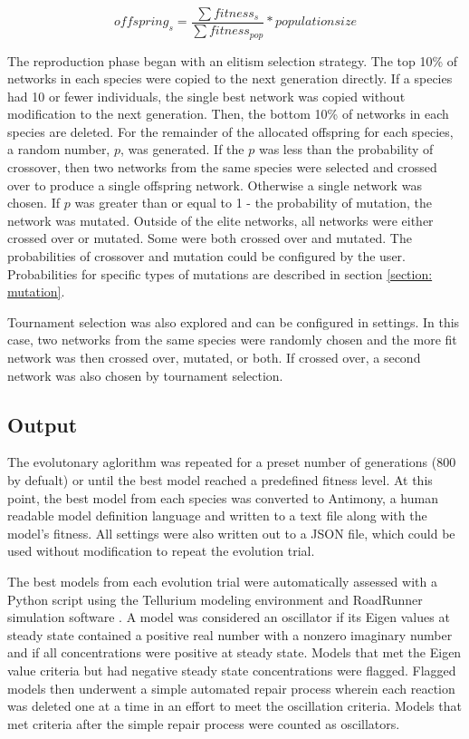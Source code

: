 \documentclass[12pt]{report}
\begin{document}
\begin{equation}
\label{equation: num_offspring}
offspring_{s} = \frac{\sum{fitness_{s}}}{\sum{fitness_{pop}}}*populationsize
\end{equation} 


The reproduction phase began with an elitism selection strategy. The top 10\% of networks in each species were copied to the next generation directly. If a species had 10 or fewer individuals, the single best network was copied without modification to the next generation. Then, the bottom 10\% of networks in each species are deleted. For the remainder of the allocated offspring for each species, a random number, $p$, was generated. If the $p$ was less than the probability of crossover, then two networks from the same species were selected and crossed over to produce a single offspring network. Otherwise a single network was chosen. If $p$ was greater than or equal to 1 - the probability of mutation, the network was mutated. Outside of the elite networks, all networks were either crossed over or mutated. Some were both crossed over and mutated. The probabilities of crossover and mutation could be configured by the user. Probabilities for specific types of mutations are described in section \ref{section: mutation}.

Tournament selection was also explored and can be configured in settings. In this case, two networks from the same species were randomly chosen and the more fit network was then crossed over, mutated, or both. If crossed over, a second network was also chosen by tournament selection.

\subsection{Output}
The evolutonary aglorithm was repeated for a preset number of generations (800 by defualt) or until the best model reached a predefined fitness level. At this point, the best model from each species was converted to Antimony, a human readable model definition language \cite{Smith2009} and written to a text file along with the model's fitness. All settings were also written out to a JSON file, which could be used without modification to repeat the evolution trial.

The best models from each evolution trial were automatically assessed with a Python script using the Tellurium modeling environment \cite{Choi2018} and RoadRunner simulation software \cite{andy2020}. A model was considered an oscillator if its Eigen values at steady state contained a positive real number with a nonzero imaginary number and if all concentrations were positive at steady state. Models that met the Eigen value criteria but had negative steady state concentrations were flagged. Flagged models then underwent a simple automated repair process wherein each reaction was deleted one at a time in an effort to meet the oscillation criteria. Models that met criteria after the simple repair process were counted as oscillators.
\end{document}
